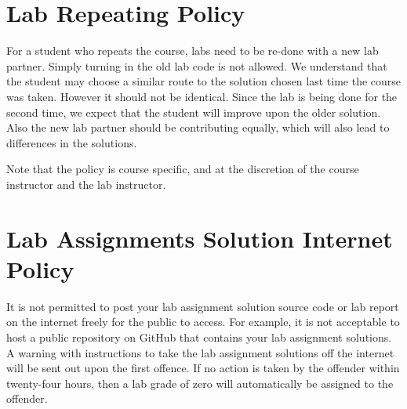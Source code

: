 \section*{Lab Repeating Policy}
For a student who repeats the course, labs need to be re-done with a new lab partner. 
Simply turning in the old lab code is not allowed. 
We understand that the student may choose a similar route to the solution chosen last time 
the course was taken. However it should not be identical. Since the lab is being done for the second time,
we expect that the student will improve upon the older solution. Also the new lab partner should be 
contributing equally, which will also lead to differences in the solutions. 

Note that the policy is course specific, and at the discretion of the course instructor and the lab instructor.

\section*{Lab Assignments Solution Internet Policy} 
It is not permitted to post your lab assignment solution source code or lab report on the internet freely for the public to access. For example, it is not acceptable to host a public repository on GitHub that contains your lab assignment solutions. A warning with instructions to take the lab assignment solutions off the internet will be sent out upon the first offence. If no action is taken by the offender within twenty-four hours, then a lab grade of zero will automatically be assigned to the offender.
    
